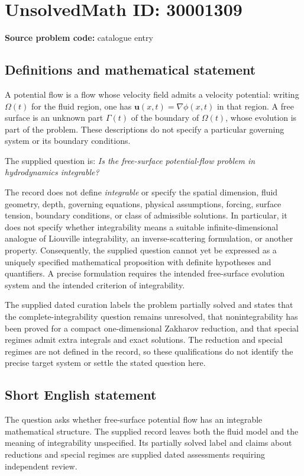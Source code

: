 \documentclass[11pt]{article}
\begin{document}
\section*{UnsolvedMath ID: 30001309}
\textbf{Source problem code:} catalogue entry
\subsection{Definitions and mathematical statement}
A potential flow is a flow whose velocity field admits a velocity potential: writing \(\Omega(t)\) for the fluid region, one has \(\boldsymbol{u}(x,t)=\nabla\phi(x,t)\) in that region. A free surface is an unknown part \(\Gamma(t)\) of the boundary of \(\Omega(t)\), whose evolution is part of the problem. These descriptions do not specify a particular governing system or its boundary conditions.

The supplied question is: \emph{Is the free-surface potential-flow problem in hydrodynamics integrable?}

The record does not define \emph{integrable} or specify the spatial dimension, fluid geometry, depth, governing equations, physical assumptions, forcing, surface tension, boundary conditions, or class of admissible solutions. In particular, it does not specify whether integrability means a suitable infinite-dimensional analogue of Liouville integrability, an inverse-scattering formulation, or another property. Consequently, the supplied question cannot yet be expressed as a uniquely specified mathematical proposition with definite hypotheses and quantifiers. A precise formulation requires the intended free-surface evolution system and the intended criterion of integrability.

The supplied dated curation labels the problem partially solved and states that the complete-integrability question remains unresolved, that nonintegrability has been proved for a compact one-dimensional Zakharov reduction, and that special regimes admit extra integrals and exact solutions. The reduction and special regimes are not defined in the record, so these qualifications do not identify the precise target system or settle the stated question here.
\subsection{Short English statement}
The question asks whether free-surface potential flow has an integrable mathematical structure. The supplied record leaves both the fluid model and the meaning of integrability unspecified. Its partially solved label and claims about reductions and special regimes are supplied dated assessments requiring independent review.
\end{document}
